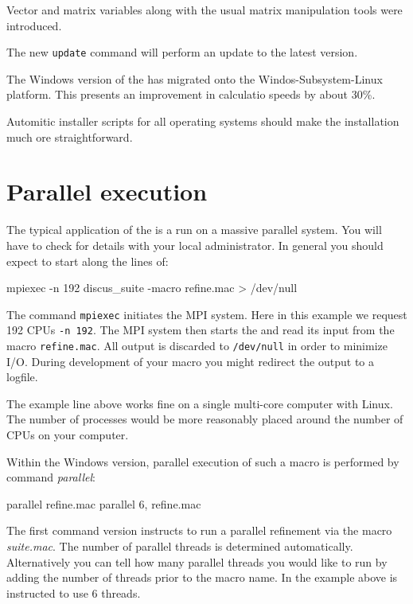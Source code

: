 Vector and matrix variables along with the usual matrix 
manipulation tools were introduced.  

The new {\tt update} command will perform an update to the latest 
version.

The Windows version of the \Suite has migrated onto the
Windos-Subsystem-Linux platform. This presents an improvement
in calculatio speeds by about 30\%.

Automitic installer scripts for all operating systems should make
the installation much ore straightforward.

\section{Parallel execution \label{intro-par}}

The typical application of the \Suite is a run on a massive parallel 
system. You will have to check for details with your local administrator.
In general you should expect to start \Suite along the lines of:

\begin{MacVerbatim}
mpiexec -n 192 discus_suite -macro refine.mac > /dev/null
\end{MacVerbatim}

The command {\tt mpiexec} initiates the MPI system. Here in this example
we request 192 CPUs {\tt -n 192}. The MPI system then starts the \Suite
and read its input from the macro {\tt refine.mac}. All output is discarded
 to {\tt /dev/null} in order to minimize I/O. During development of your 
macro you might redirect the output to a logfile.

The example line above works fine on a single multi-core computer with 
Linux. The number of processes would be more reasonably placed around 
the number of CPUs on your computer.

Within the Windows version, parallel execution of such a macro is 
performed by \Suite command {\it parallel}:

\begin{MacVerbatim}
parallel refine.mac 
parallel 6, refine.mac 
\end{MacVerbatim}

The first command version instructs \Suite to run a parallel 
refinement via the macro {\it suite.mac}. The number of parallel 
threads is determined automatically. Alternatively you can tell 
\Suite how many parallel threads you would like to run by adding the
number of threads prior to the macro name. In the example above 
\Suite is instructed to use 6 threads.


